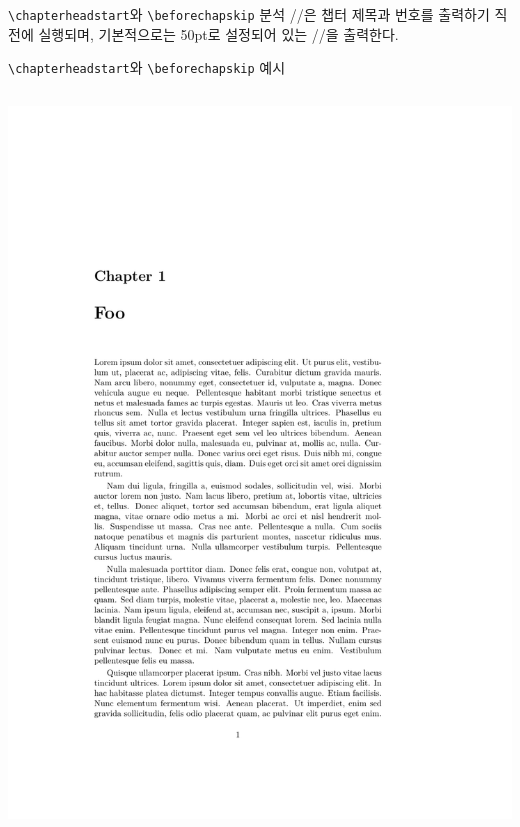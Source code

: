 \documentclass{beamer}
\def\tbs{\textbackslash}
\begin{document}
\begin{frame}[fragile]
  {\texttt{\tbs chapterheadstart}와 \texttt{\tbs beforechapskip} 분석}
  \ltxverb/\chapterheadstart/은 챕터 제목과 번호를 출력하기 직전에 실행되며,
  기본적으로는 50pt로 설정되어 있는 \ltxverb/\beforechapskip/을 출력한다.
\end{frame}

\begin{frame}[fragile]
  {\texttt{\tbs chapterheadstart}와 \texttt{\tbs beforechapskip} 예시}
  \begin{overprint}
    \begin{columns}
      \begin{column}{0.5\textwidth}
        \begin{latexcode}
          \setlength\beforechapskip{50pt}
        \end{latexcode}
        \begin{center}
          \includegraphics[frame,page=1,width=0.8\linewidth]{examples/chapterheadstart}
        \end{center}
      \end{column}


\end{columns}
\end{overprint}
\end{frame}
\end{document}
